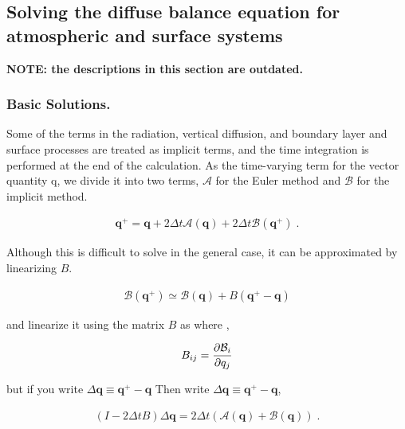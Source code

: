 \hypertarget{solving-the-diffuse-balance-equation-for-atmospheric-and-surface-systems}{%
\subsection{Solving the diffuse balance equation for atmospheric and
surface
systems}\label{solving-the-diffuse-balance-equation-for-atmospheric-and-surface-systems}}

\textbf{NOTE: the descriptions in this section are outdated.}

\hypertarget{basic-solutions.}{%
\subsubsection{Basic Solutions.}\label{basic-solutions.}}

Some of the terms in the radiation, vertical diffusion, and boundary
layer and surface processes are treated as implicit terms, and the time
integration is performed at the end of the calculation. As the
time-varying term for the vector quantity {q}, we divide it into two
terms, \({\mathcal A}\) for the Euler method and \({\mathcal B}\) for
the implicit method.

\begin{eqnarray}
  {\mathbf q}^+
      = {\mathbf q} + 2 \Delta t {\mathcal A}( {\mathbf q}   )
                           + 2 \Delta t {\mathcal B}( {\mathbf q}^+ ) \; .
\end{eqnarray}

Although this is difficult to solve in the general case, it can be
approximated by linearizing \(B\).

\begin{eqnarray}
  {\mathcal B}( {\mathbf q}^+ )
                           \simeq {\mathcal B}( {\mathbf q} )
                            + B( {\mathbf q}^+ - {\mathbf q} )
\end{eqnarray}

and linearize it using the matrix \(B\) as where ,

\begin{eqnarray}
  B_{ij} = \frac{\partial{{\cal B}_i}}{\partial {q_j}}
\end{eqnarray}

but if you write
\(\Delta {\mathbf q} \equiv {\mathbf q}^+ - {\mathbf q}\) Then write
\(\Delta {\mathbf q} \equiv {\mathbf q}^+ - {\mathbf q}\),

\begin{eqnarray}
  ( I - 2 \Delta t B ) \Delta {\mathbf q}
      = 2 \Delta t \left(  {\mathcal A}( {\mathbf q} )
                         + {\mathcal B}( {\mathbf q} ) \right) \; .
\end{eqnarray}


